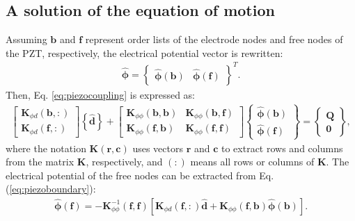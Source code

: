 \documentclass[sensors,article,submit,moreauthors,pdftex]{Definitions/mdpi}
\begin{document}
\subsection{A solution of the equation of motion}
\label{sec:time_integration}
Assuming \(\textbf{b}\) and \(\textbf{f}\) represent order lists of the electrode nodes and free nodes of the PZT, respectively, the electrical potential vector is rewritten:
\begin{eqnarray}
\widehat{\boldsymbol{\phi}} = \left \{\begin{array}{cc}
\widehat{\boldsymbol{\phi}}(\textbf{b}) &
\widehat{\boldsymbol{\phi}}(\textbf{f})
\end{array}\right \}^T.
\label{eq:potential}
\end{eqnarray}
Then, Eq. \ref{eq:piezocoupling} is expressed as:
\begin{eqnarray}
\left [\begin{array}{c}
\textbf{K}_{\phi d}(\textbf{b},:) \\
\textbf{K}_{\phi d}(\textbf{f},:)
\end{array}\right]
\left \{\widehat{\textbf{d}}\right\} +
\left [\begin{array}{cc}
\textbf{K}_{\phi \phi}(\textbf{b},\textbf{b}) & \textbf{K}_{\phi \phi}(\textbf{b},\textbf{f})\\
\textbf{K}_{\phi \phi}(\textbf{f},\textbf{b}) & \textbf{K}_{\phi \phi}(\textbf{f},\textbf{f})
\end{array}\right]
\left \{\begin{array}{c}
\widehat{\boldsymbol{\phi}}(\textbf{b}) \\
\widehat{\boldsymbol{\phi}}(\textbf{f})
\end{array}\right \} = 
\left \{\begin{array}{c}
\textbf{Q} \\
\textbf{0}
\end{array}\right \},
\label{eq:piezoboundary}
\end{eqnarray} 
where the notation \(\textbf{K}(\textbf{r},\textbf{c})\) uses vectors \(\textbf{r}\) and \(\textbf{c}\) to extract rows and columns from the matrix \(\textbf{K}\), respectively, and \((:)\) means all rows or columns of \(\textbf{K}\).
The electrical potential of the free nodes can be extracted from Eq. (\ref{eq:piezoboundary}):
\begin{eqnarray}
\widehat{\boldsymbol{\phi}}(\textbf{f}) = -\textbf{K}_{\phi\phi}^{-1}(\textbf{f},\textbf{f})\left[\textbf{K}_{\phi d}(\textbf{f},:) \widehat{\textbf{d}} + \textbf{K}_{\phi\phi}(\textbf{f},\textbf{b})\widehat{\boldsymbol{\phi}}(\textbf{b}) \right].
\label{eq:freePotetial}
\end{eqnarray}
\end{document}
